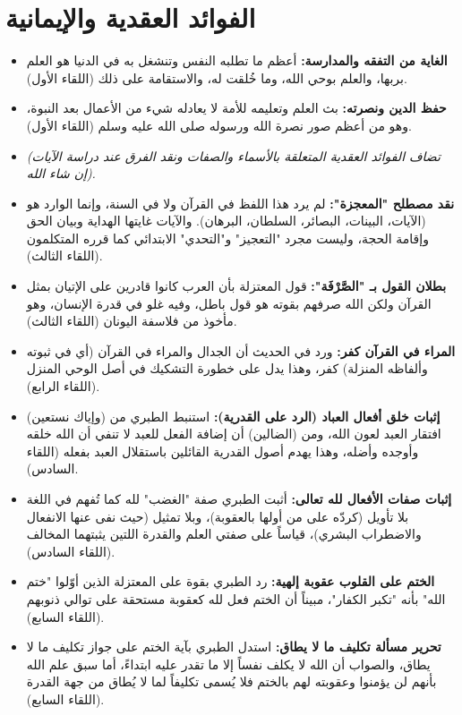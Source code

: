 \section{الفوائد العقدية والإيمانية}
\begin{itemize}
    \item \textbf{الغاية من التفقه والمدارسة:} أعظم ما تطلبه النفس وتنشغل به في الدنيا هو العلم بربها، والعلم بوحي الله، وما خُلقت له، والاستقامة على ذلك (اللقاء الأول).
    \item \textbf{حفظ الدين ونصرته:} بث العلم وتعليمه للأمة لا يعادله شيء من الأعمال بعد النبوة، وهو من أعظم صور نصرة الله ورسوله صلى الله عليه وسلم (اللقاء الأول).
    \item \textit{(تضاف الفوائد العقدية المتعلقة بالأسماء والصفات ونقد الفرق عند دراسة الآيات إن شاء الله).}
    \item \textbf{نقد مصطلح "المعجزة":} لم يرد هذا اللفظ في القرآن ولا في السنة، وإنما الوارد هو (الآيات، البينات، البصائر، السلطان، البرهان). والآيات غايتها الهداية وبيان الحق وإقامة الحجة، وليست مجرد "التعجيز" و"التحدي" الابتدائي كما قرره المتكلمون (اللقاء الثالث).
    \item \textbf{بطلان القول بـ "الصَّرْفَة":} قول المعتزلة بأن العرب كانوا قادرين على الإتيان بمثل القرآن ولكن الله صرفهم بقوته هو قول باطل، وفيه غلو في قدرة الإنسان، وهو مأخوذ من فلاسفة اليونان (اللقاء الثالث).
    \item \textbf{المراء في القرآن كفر:} ورد في الحديث أن الجدال والمراء في القرآن (أي في ثبوته وألفاظه المنزلة) كفر، وهذا يدل على خطورة التشكيك في أصل الوحي المنزل (اللقاء الرابع).
    \item \textbf{إثبات خلق أفعال العباد (الرد على القدرية):} استنبط الطبري من (وإياك نستعين) افتقار العبد لعون الله، ومن (الضالين) أن إضافة الفعل للعبد لا تنفي أن الله خلقه وأوجده وأضله، وهذا يهدم أصول القدرية القائلين باستقلال العبد بفعله (اللقاء السادس).
    \item \textbf{إثبات صفات الأفعال لله تعالى:} أثبت الطبري صفة "الغضب" لله كما تُفهم في اللغة بلا تأويل (كردّه على من أولها بالعقوبة)، وبلا تمثيل (حيث نفى عنها الانفعال والاضطراب البشري)، قياساً على صفتي العلم والقدرة اللتين يثبتهما المخالف (اللقاء السادس).
    \item \textbf{الختم على القلوب عقوبة إلهية:} رد الطبري بقوة على المعتزلة الذين أوّلوا "ختم الله" بأنه "تكبر الكفار"، مبيناً أن الختم فعل لله كعقوبة مستحقة على توالي ذنوبهم (اللقاء السابع).
    \item \textbf{تحرير مسألة تكليف ما لا يطاق:} استدل الطبري بآية الختم على جواز تكليف ما لا يطاق، والصواب أن الله لا يكلف نفساً إلا ما تقدر عليه ابتداءً، أما سبق علم الله بأنهم لن يؤمنوا وعقوبته لهم بالختم فلا يُسمى تكليفاً لما لا يُطاق من جهة القدرة (اللقاء السابع).

\end{itemize}
